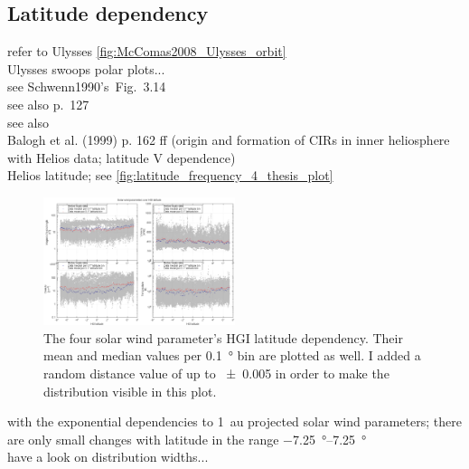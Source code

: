 \subsection{Latitude dependency}
refer to Ulysses \autoref{fig:McComas2008_Ulysses_orbit}\\
Ulysses swoops polar plots...\\

see Schwenn1990's~Fig.~3.14\\
see also \citet{Schwenn1990} p.~127\\
see also \citet{Richardson1995}\\
Balogh et al. (1999) p. 162 ff (origin and formation of CIRs in inner heliosphere with Helios data; latitude V dependence)\\

Helios latitude; see \autoref{fig:latitude_frequency_4_thesis_plot}
\begin{figure}[htb]
	\centering
	\includegraphics[width=0.5\textwidth]{figures_of_mine/gnuplots/latitude_frequency_4_thesis_plot.png}
	\caption{The four solar wind parameter's HGI latitude dependency. Their mean and median values per \SI{0.1}{\degree} bin are plotted as well. I added a random distance value of up to \SI{+-0.005}{\au} in order to make the distribution visible in this plot.}
	\label{fig:latitude_frequency_4_thesis_plot}
\end{figure}

with the exponential dependencies to 1~au projected solar wind parameters; there are only small changes with latitude in the range \SIrange{-7.25}{7.25}{\degree}\\
have a look on distribution widths...\\

